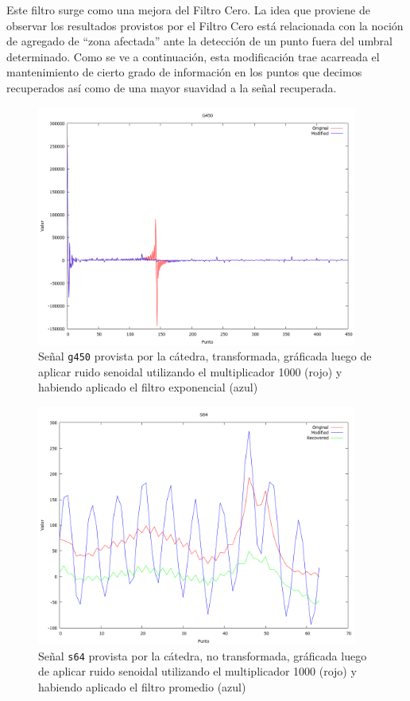 Este filtro surge como una mejora del Filtro Cero. La idea que proviene de
observar los resultados provistos por el Filtro Cero est\'a relacionada con la
noci\'on de agregado de ``zona afectada'' ante la detecci\'on de un punto fuera
del umbral determinado. Como se ve a continuaci\'on, esta modificaci\'on trae
acarreada el mantenimiento de cierto grado de informaci\'on en los puntos que
decimos recuperados as\'i como de una mayor suavidad a la se\~nal recuperada.


\begin{figure}
\begin {center}
\includegraphics[width=299pt]{imagenes/g450-sin100-exp-spec.png}
\end {center}
\caption{Se\~nal \texttt{g450} provista por la c\'atedra, transformada, gr\'aficada
luego de aplicar ruido senoidal utilizando el multiplicador 1000 (rojo) y 
habiendo aplicado el filtro exponencial (azul)}
\label{fig:SinProm}
\end{figure}

\begin{figure}
\begin {center}
\includegraphics[width=299pt]{imagenes/s64-sin100-exp.png}
\end {center}
\caption{Se\~nal \texttt{s64} provista por la c\'atedra, no transformada, gr\'aficada
luego de aplicar ruido senoidal utilizando el multiplicador 1000 (rojo) y 
habiendo aplicado el filtro promedio (azul)}
\label{fig:SinProm}
\end{figure}


